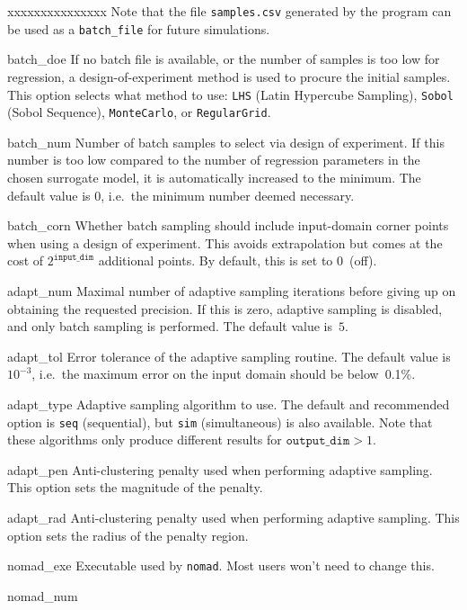 \documentclass[a4paper,bibliography=numbered]{scrartcl}
\begin{document}
\begin{labeling}{xxxxxxxxxxxxxxx}
        Note that the file \texttt{samples.csv} generated by the program can be used as a \texttt{batch\_file} for future simulations.
    \item[batch\_doe]
        If no batch file is available, or the number of samples is too low for regression, a design-of-experiment method is used to procure the initial samples.
        This option selects what method to use: \texttt{LHS} (Latin Hypercube Sampling), \texttt{Sobol} (Sobol Sequence), \texttt{MonteCarlo}, or \texttt{RegularGrid}.
    \item[batch\_num]
        Number of batch samples to select via design of experiment.
        If this number is too low compared to the number of regression parameters in the chosen surrogate model, it is automatically increased to the minimum.
        The default value is 0, i.e.\ the minimum number deemed necessary.
    \item[batch\_corn]
        Whether batch sampling should include input-domain corner points when using a design of experiment. This avoids extrapolation but comes at the cost of $2^{\texttt{input\_dim}}$ additional points.
        By default, this is set to 0~(off).
    \item[adapt\_num]
        Maximal number of adaptive sampling iterations before giving up on obtaining the requested precision.
        If this is zero, adaptive sampling is disabled, and only batch sampling is performed.
        The default value is~$5$.
    \item[adapt\_tol]
        Error tolerance of the adaptive sampling routine.
        The default value is~$10^{-3}$, i.e.\ the maximum error on the input domain should be below~0.1\%.
    \item[adapt\_type]
        Adaptive sampling algorithm to use.
        The default and recommended option is \texttt{seq} (sequential), but \texttt{sim} (simultaneous) is also available.
        Note that these algorithms only produce different results for $\texttt{output\_dim} > 1$.
    \item[adapt\_pen]
        Anti-clustering penalty used when performing adaptive sampling.
        This option sets the magnitude of the penalty.
    \item[adapt\_rad]
        Anti-clustering penalty used when performing adaptive sampling.
        This option sets the radius of the penalty region.
    \item[nomad\_exe]
        Executable used by \texttt{nomad}.
        Most users won't need to change this.
    \item[nomad\_num]

\end{labeling}
\end{document}
